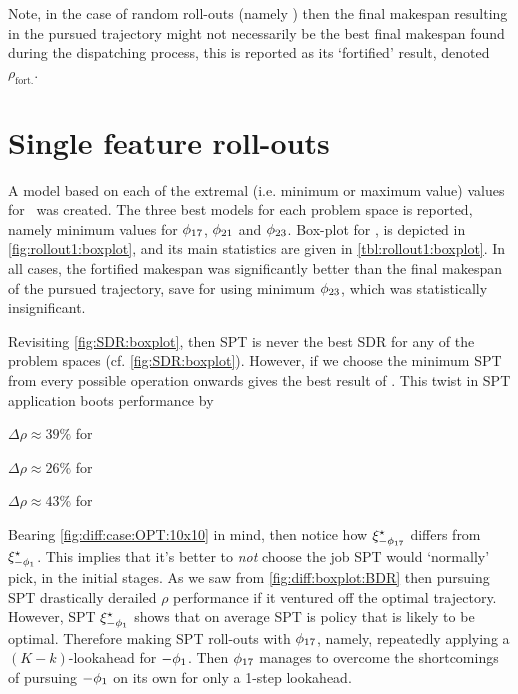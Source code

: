 Note, in the case of random roll-outs (namely \phiRNDRelated) then the final makespan resulting in the pursued trajectory might not necessarily be the best final makespan found during the dispatching process, this is reported as its `fortified' result, denoted $\rho_{\text{fort.}}$. 

\section{Single feature roll-outs}

A model based on each of the extremal (i.e. minimum or maximum value) values 
for \phiGlobalRelated\ was created. The three best models for each problem 
space is reported, namely minimum values for $\phi_{17}$, $\phi_{21}$ and 
$\phi_{23}$. 
Box-plot for \namerho, is depicted in \cref{fig:rollout1:boxplot}, and its 
main statistics are given in \cref{tbl:rollout1:boxplot}.
In all cases, the fortified makespan was significantly better than the final 
makespan of the pursued trajectory, save for  using minimum 
$\phi_{23}$, which was statistically insignificant.

Revisiting \cref{fig:SDR:boxplot}, then SPT is never the best SDR for any of 
the problem spaces (cf. \cref{fig:SDR:boxplot}).
However, if we choose the minimum SPT from every possible operation onwards 
gives the best result of \phiSDRRelated. This twist in SPT application boots 
performance by 
\begin{enumerate*}
    \item $\Delta\rho\approx 39\%$ for 
    \item $\Delta\rho\approx 26\%$ for 
    \item $\Delta\rho\approx 43\%$ for 
\end{enumerate*}
Bearing \cref{fig:diff:case:OPT:10x10} in mind, then notice how 
$\xi^{\star}_{-\phi_{17}}$ differs from $\xi^{\star}_{-\phi_1}$. This implies 
that it's better to \emph{not} choose the job SPT would `normally' pick, in the 
initial stages. As we saw from \cref{fig:diff:boxplot:BDR} then pursuing SPT 
drastically derailed $\rho$ performance if it ventured off the optimal 
trajectory. 
However, SPT $\xi^{\star}_{-\phi_1}$ shows that on average SPT is policy that 
is likely to be optimal. 
Therefore making SPT roll-outs with $\phi_{17}$, namely, repeatedly applying a 
$(K-k)$-lookahead for $-\phi_1$. 
Then $\phi_{17}$ manages to overcome the shortcomings of pursuing $-\phi_1$ on 
its own for only a 1-step lookahead.


